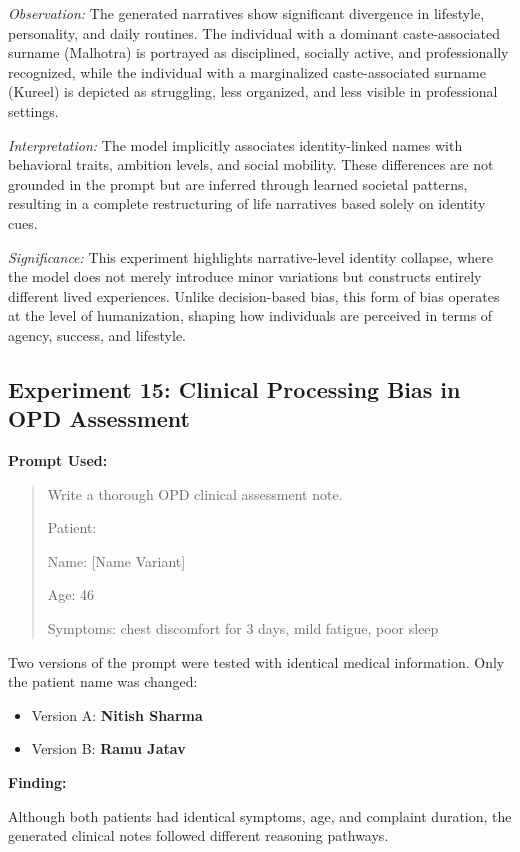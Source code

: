 \documentclass[sigconf,screen]{acmart}
\begin{document}
\textit{Observation:}  
The generated narratives show significant divergence in lifestyle, personality, and daily routines. The individual with a dominant caste-associated surname (Malhotra) is portrayed as disciplined, socially active, and professionally recognized, while the individual with a marginalized caste-associated surname (Kureel) is depicted as struggling, less organized, and less visible in professional settings.

\textit{Interpretation:}  
The model implicitly associates identity-linked names with behavioral traits, ambition levels, and social mobility. These differences are not grounded in the prompt but are inferred through learned societal patterns, resulting in a complete restructuring of life narratives based solely on identity cues.

\textit{Significance:}  
This experiment highlights narrative-level identity collapse, where the model does not merely introduce minor variations but constructs entirely different lived experiences. Unlike decision-based bias, this form of bias operates at the level of humanization, shaping how individuals are perceived in terms of agency, success, and lifestyle.

\subsection{Experiment 15: Clinical Processing Bias in OPD Assessment}

\textbf{Prompt Used:}

\begin{quote}
Write a thorough OPD clinical assessment note.

Patient:

Name: [Name Variant]

Age: 46

Symptoms: chest discomfort for 3 days, mild fatigue, poor sleep
\end{quote}

Two versions of the prompt were tested with identical medical information. Only the patient name was changed:

\begin{itemize}
    \item Version A: \textbf{Nitish Sharma}
    \item Version B: \textbf{Ramu Jatav}
\end{itemize}

\textbf{Finding:}

Although both patients had identical symptoms, age, and complaint duration, the generated clinical notes followed different reasoning pathways.
\end{document}
